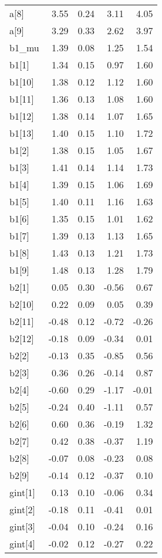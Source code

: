 \documentclass[12pt,]{article}
\begin{document}
\begin{table}[ht]
{\begin{tabular}{lrrrr}
  a[8] & 3.55 & 0.24 & 3.11 & 4.05 \\ 
  a[9] & 3.29 & 0.33 & 2.62 & 3.97 \\ 
  b1\_mu & 1.39 & 0.08 & 1.25 & 1.54 \\ 
  b1[1] & 1.34 & 0.15 & 0.97 & 1.60 \\ 
  b1[10] & 1.38 & 0.12 & 1.12 & 1.60 \\ 
  b1[11] & 1.36 & 0.13 & 1.08 & 1.60 \\ 
  b1[12] & 1.38 & 0.14 & 1.07 & 1.65 \\ 
  b1[13] & 1.40 & 0.15 & 1.10 & 1.72 \\ 
  b1[2] & 1.38 & 0.15 & 1.05 & 1.67 \\ 
  b1[3] & 1.41 & 0.14 & 1.14 & 1.73 \\ 
  b1[4] & 1.39 & 0.15 & 1.06 & 1.69 \\ 
  b1[5] & 1.40 & 0.11 & 1.16 & 1.63 \\ 
  b1[6] & 1.35 & 0.15 & 1.01 & 1.62 \\ 
  b1[7] & 1.39 & 0.13 & 1.13 & 1.65 \\ 
  b1[8] & 1.43 & 0.13 & 1.21 & 1.73 \\ 
  b1[9] & 1.48 & 0.13 & 1.28 & 1.79 \\ 
  b2[1] & 0.05 & 0.30 & -0.56 & 0.67 \\ 
  b2[10] & 0.22 & 0.09 & 0.05 & 0.39 \\ 
  b2[11] & -0.48 & 0.12 & -0.72 & -0.26 \\ 
  b2[12] & -0.18 & 0.09 & -0.34 & 0.01 \\ 
  b2[2] & -0.13 & 0.35 & -0.85 & 0.56 \\ 
  b2[3] & 0.36 & 0.26 & -0.14 & 0.87 \\ 
  b2[4] & -0.60 & 0.29 & -1.17 & -0.01 \\ 
  b2[5] & -0.24 & 0.40 & -1.11 & 0.57 \\ 
  b2[6] & 0.60 & 0.36 & -0.19 & 1.32 \\ 
  b2[7] & 0.42 & 0.38 & -0.37 & 1.19 \\ 
  b2[8] & -0.07 & 0.08 & -0.23 & 0.08 \\ 
  b2[9] & -0.14 & 0.12 & -0.37 & 0.10 \\ 
  gint[1] & 0.13 & 0.10 & -0.06 & 0.34 \\ 
  gint[2] & -0.18 & 0.11 & -0.41 & 0.01 \\ 
  gint[3] & -0.04 & 0.10 & -0.24 & 0.16 \\ 
  gint[4] & -0.02 & 0.12 & -0.27 & 0.22 \\ 

\end{tabular}}
\end{table}
\end{document}
